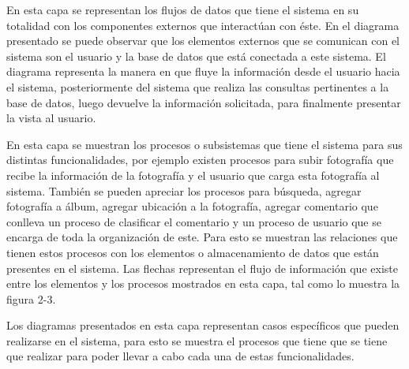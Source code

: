 \documentclass{memoria}
\begin{document}
En esta capa se representan los flujos de datos que tiene el sistema en su totalidad con los componentes externos que interactúan con éste. En el diagrama presentado se puede observar que los elementos externos que se comunican con el sistema son el usuario y la base de datos que está conectada a este sistema. El diagrama representa la manera en que fluye la información desde el usuario hacia el sistema, posteriormente del sistema que realiza las consultas pertinentes a la base de datos, luego devuelve la información solicitada, para finalmente presentar la vista al usuario.

\newpage
{}


En esta capa se muestran los procesos o subsistemas que tiene el sistema para sus distintas funcionalidades, por ejemplo existen procesos para subir fotografía que recibe la información de la fotografía y el usuario que carga esta fotografía al sistema. También se pueden apreciar los procesos para búsqueda, agregar fotografía a álbum, agregar ubicación a la fotografía, agregar comentario que conlleva un proceso de clasificar el comentario y un proceso de usuario que se encarga de toda la organización de este. Para esto se muestran las relaciones que tienen estos procesos con los elementos o almacenamiento de datos que están presentes en el sistema. Las flechas representan el flujo de información que existe entre los elementos y los procesos mostrados en esta capa, tal como lo muestra la figura 2-3.


Los diagramas presentados en esta capa representan casos específicos que pueden realizarse en el sistema, para esto se muestra el procesos que tiene que se tiene que realizar para poder llevar a cabo cada una de estas funcionalidades. 
\end{document}
